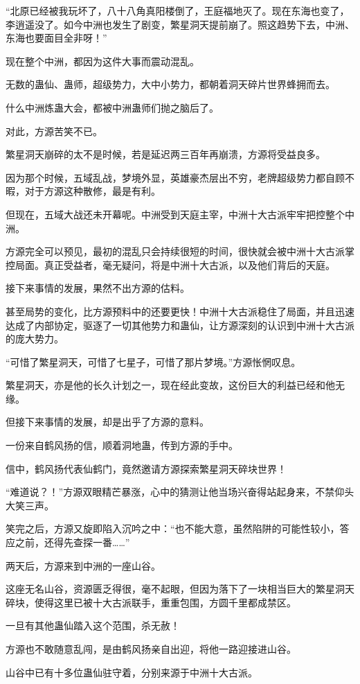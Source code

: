 \begin{this_body}
“北原已经被我玩坏了，八十八角真阳楼倒了，王庭福地灭了。现在东海也变了，李逍遥没了。如今中洲也发生了剧变，繁星洞天提前崩了。照这趋势下去，中洲、东海也要面目全非呀！”

现在整个中洲，都因为这件大事而震动混乱。

无数的蛊仙、蛊师，超级势力，大中小势力，都朝着洞天碎片世界蜂拥而去。

什么中洲炼蛊大会，都被中洲蛊师们抛之脑后了。

对此，方源苦笑不已。

繁星洞天崩碎的太不是时候，若是延迟两三百年再崩溃，方源将受益良多。

因为那个时候，五域乱战，梦境外显，英雄豪杰层出不穷，老牌超级势力都自顾不暇，对于方源这种散修，最是有利。

但现在，五域大战还未开幕呢。中洲受到天庭主宰，中洲十大古派牢牢把控整个中洲。

方源完全可以预见，最初的混乱只会持续很短的时间，很快就会被中洲十大古派掌控局面。真正受益者，毫无疑问，将是中洲十大古派，以及他们背后的天庭。

接下来事情的发展，果然不出方源的估料。

甚至局势的变化，比方源预料中的还要更快！中洲十大古派稳住了局面，并且迅速达成了内部协定，驱逐了一切其他势力和蛊仙，让方源深刻的认识到中洲十大古派的庞大势力。

“可惜了繁星洞天，可惜了七星子，可惜了那片梦境。”方源怅惘叹息。

繁星洞天，亦是他的长久计划之一，现在经此变故，这份巨大的利益已经和他无缘。

但接下来事情的发展，却是出乎了方源的意料。

一份来自鹤风扬的信，顺着洞地蛊，传到方源的手中。

信中，鹤风扬代表仙鹤门，竟然邀请方源探索繁星洞天碎块世界！

“难道说？！”方源双眼精芒暴涨，心中的猜测让他当场兴奋得站起身来，不禁仰头大笑三声。

笑完之后，方源又旋即陷入沉吟之中：“也不能大意，虽然陷阱的可能性较小，答应之前，还得先查探一番……”

两天后，方源来到中洲的一座山谷。

这座无名山谷，资源匮乏得很，毫不起眼，但因为落下了一块相当巨大的繁星洞天碎块，使得这里已被十大古派联手，重重包围，方圆千里都成禁区。

一旦有其他蛊仙踏入这个范围，杀无赦！

方源也不敢随意乱闯，是由鹤风扬亲自出迎，将他一路迎接进山谷。

山谷中已有十多位蛊仙驻守着，分别来源于中洲十大古派。


\end{this_body}
